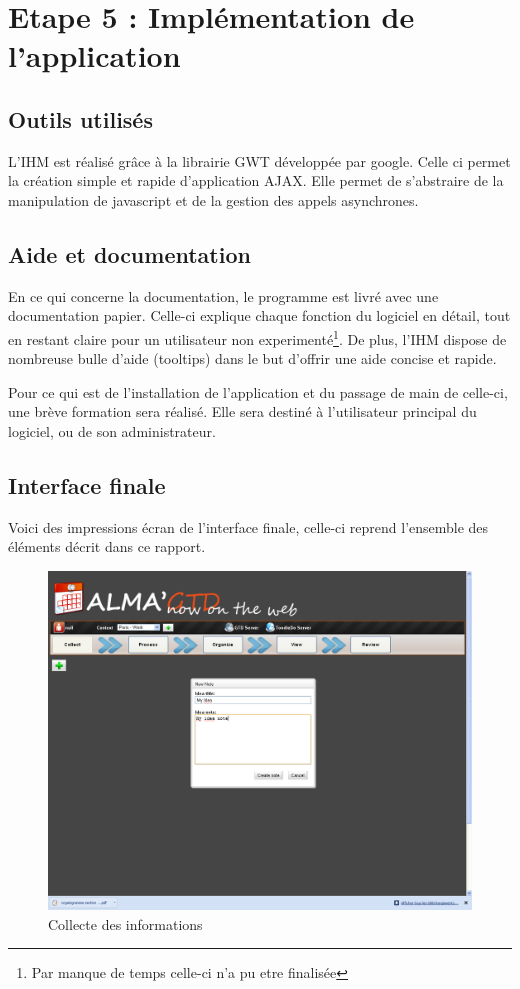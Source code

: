 \chapter{Etape 5 : Implémentation de l’application}

\section{Outils utilisés}
L'IHM est réalisé grâce à la librairie GWT développée par google. Celle ci permet la création simple et rapide d'application AJAX. Elle permet de s'abstraire de la manipulation de javascript et de la gestion des appels asynchrones.



\section{Aide et documentation}
En ce qui concerne la documentation, le programme est livré avec une documentation papier. Celle-ci explique chaque fonction du logiciel en détail, tout en restant claire pour un utilisateur non experimenté\footnote{Par manque de temps celle-ci n'a pu etre finalisée}. De plus, l'IHM dispose de nombreuse bulle d'aide (tooltips) dans le but d'offrir une aide concise et rapide.

\bigskip

Pour ce qui est de l'installation de l'application et du passage de main de celle-ci, une brève formation sera réalisé. Elle sera destiné à l'utilisateur principal du logiciel, ou de son administrateur.


\section{Interface finale}

Voici des impressions écran de l'interface finale, celle-ci reprend l'ensemble des éléments décrit dans ce rapport.
\begin{figure}[H]
  \begin{center}
  \includegraphics[scale=0.5]{diagrams/D.png}
  \caption{Collecte des informations}
  \end{center}
\end{figure}



